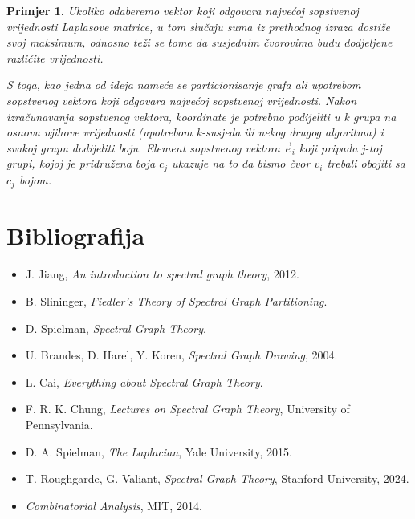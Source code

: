 \documentclass[11pt]{article}
\newtheorem{example}{Primjer}
\begin{document}
\begin{example}
        Ukoliko odaberemo vektor koji odgovara najvećoj sopstvenoj vrijednosti Laplasove matrice, u tom slučaju suma iz prethodnog izraza
        dostiže svoj maksimum, odnosno teži se tome da susjednim čvorovima budu dodjeljene različite vrijednosti. 

        S toga, kao jedna od ideja nameće se particionisanje grafa ali upotrebom sopstvenog vektora koji odgovara najvećoj sopstvenoj vrijednosti.
        Nakon izračunavanja sopstvenog vektora, koordinate je potrebno podijeliti u k grupa na osnovu njihove vrijednosti (upotrebom k-susjeda ili nekog drugog algoritma) i svakoj grupu dodijeliti boju.
        Element sopstvenog vektora $\vec{e}_i$ koji pripada j-toj grupi, kojoj je pridružena boja $c_j$ ukazuje na to da bismo čvor $v_i$ trebali obojiti sa $c_j$ bojom.

    \end{example}

	\newpage

	\section*{Bibliografija}
\begin{itemize}
    \item [\textbf{[1]}] J. Jiang, \textit{An introduction to spectral graph theory}, 2012.
    \item [\textbf{[2]}] B. Slininger, \textit{Fiedler's Theory of Spectral Graph Partitioning}.
    \item [\textbf{[3]}] D. Spielman, \textit{Spectral Graph Theory}.
    \item [\textbf{[4]}] U. Brandes, D. Harel, Y. Koren, \textit{Spectral Graph Drawing}, 2004.
    \item [\textbf{[5]}] L. Cai, \textit{Everything about Spectral Graph Theory}.
    \item [\textbf{[6]}] F. R. K. Chung, \textit{Lectures on Spectral Graph Theory}, University of Pennsylvania.
    \item [\textbf{[7]}] D. A. Spielman, \textit{The Laplacian}, Yale University, 2015.
    \item [\textbf{[8]}] T. Roughgarde, G. Valiant, \textit{Spectral Graph Theory}, Stanford University, 2024.
    \item [\textbf{[9]}] \textit{Combinatorial Analysis}, MIT, 2014.
\end{itemize}

	
\end{document}

